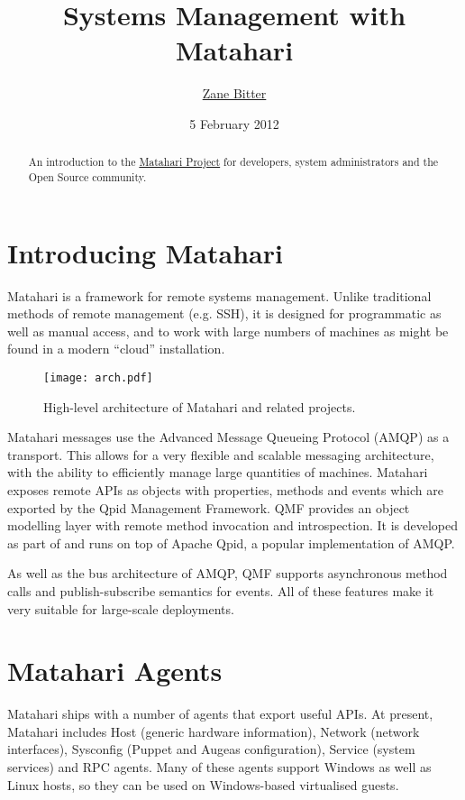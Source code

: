 \documentclass{tufte-handout}
\title{Systems Management with Matahari}
\author{\href{mailto:zbitter@redhat.com}{Zane Bitter}}
\date{5 February 2012}
\begin{document}
\maketitle

\marginnote{\tableofcontents \vspace{2em}}

\begin{abstract}
An introduction to the \href{http://matahariproject.org}{Matahari Project} for developers, system administrators and the Open Source community.
\end{abstract}

\section{Introducing Matahari}

Matahari is a framework for remote systems management. Unlike traditional methods of remote management (e.g. SSH), it is designed for programmatic as well as manual access, and to work with large numbers of machines as might be found in a modern ``cloud'' installation.

\begin{figure*}[b!]
\texttt{[image: arch.pdf]}
\caption{High-level architecture of Matahari and related projects.}
\label{fig:arch}
\end{figure*}

Matahari messages use the Advanced Message Queueing Protocol (AMQP) as a transport. This allows for a very flexible and scalable messaging architecture, with the ability to efficiently manage large quantities of machines.
Matahari exposes remote APIs as objects with properties, methods and events which are exported by the Qpid Management Framework. QMF provides an object modelling layer with remote method invocation and introspection. It is developed as part of and runs on top of Apache Qpid, a popular implementation of AMQP.

As well as the bus architecture of AMQP, QMF supports asynchronous method calls and publish-subscribe semantics for events. All of these features make it very suitable for large-scale deployments.

\section{Matahari Agents}

Matahari ships with a number of agents that export useful APIs. At present, Matahari includes Host (generic hardware information), Network (network interfaces), Sysconfig (Puppet and Augeas configuration), Service (system services) and RPC agents.
Many of these agents support Windows as well as Linux hosts, so they can be used on Windows-based virtualised guests.
\end{document}
